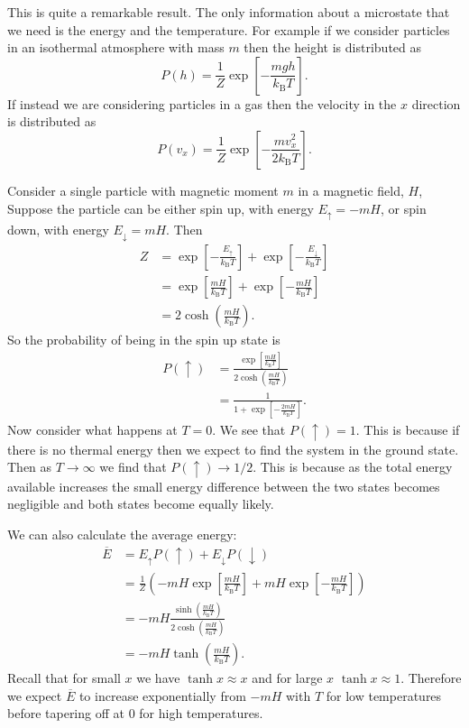\documentclass[a4paper]{article}
\newcommand{\boltzmann}{k_\mathrm{B}}
\newcommand{\mean}[1]{\overline{#1}}
\begin{document}
    This is quite a remarkable result.
    The only information about a microstate that we need is the energy and the temperature.
    For example if we consider particles in an isothermal atmosphere with mass \(m\) then the height is distributed as
    \[P(h) = \frac{1}{Z}\exp\left[-\frac{mgh}{\boltzmann T}\right].\]
    If instead we are considering particles in a gas then the velocity in the \(x\) direction is distributed as
    \[P(v_x) = \frac{1}{Z}\exp\left[-\frac{mv_x^2}{2\boltzmann T}\right].\]
    
    \begin{example}
        Consider a single particle with magnetic moment \(m\) in a magnetic field, \(H\), 
        Suppose the particle can be either spin up, with energy \(E_{\uparrow} = -mH\), or spin down, with energy \(E_{\downarrow} = mH\).
        Then
        \begin{align*}
            Z &= \exp\left[-\frac{E_{\uparrow}}{\boltzmann T}\right] + \exp\left[-\frac{E_{\downarrow}}{\boltzmann T}\right]\\
            &= \exp\left[\frac{mH}{\boltzmann T}\right] + \exp\left[-\frac{mH}{\boltzmann T}\right]\\
            &= 2\cosh\left(\frac{mH}{\boltzmann T}\right).
        \end{align*}
        So the probability of being in the spin up state is
        \begin{align*}
            P(\uparrow) &= \frac{\exp\left[\frac{mH}{\boltzmann T}\right]}{2\cosh\left(\frac{mH}{\boltzmann T}\right)}\\
            &= \frac{1}{1 + \exp\left[-\frac{2mH}{\boltzmann T}\right]}.
        \end{align*}
        Now consider what happens at \(T = 0\).
        We see that \(P(\uparrow) = 1\).
        This is because if there is no thermal energy then we expect to find the system in the ground state.
        Then as \(T \to \infty\) we find that \(P(\uparrow)\to1/2\).
        This is because as the total energy available increases the small energy difference between the two states becomes negligible and both states become equally likely.
        
        We can also calculate the average energy:
        \begin{align*}
            \mean{E} &= E_{\uparrow}P(\uparrow) + E_{\downarrow}P(\downarrow)\\
            &= \frac{1}{Z}\left(-mH\exp\left[\frac{mH}{\boltzmann T}\right] + mH\exp\left[-\frac{mH}{\boltzmann T}\right]\right)\\
            &= -mH\frac{\sinh\left(\frac{mH}{\boltzmann T}\right)}{2\cosh\left(\frac{mH}{\boltzmann T}\right)}\\
            &= -mH\tanh\left(\frac{mH}{\boltzmann T}\right).
        \end{align*}
        Recall that for small \(x\) we have \(\tanh x \approx x\) and for large \(x\) \(\tanh x\approx 1\).
        Therefore we expect \(\mean{E}\) to increase exponentially from \(-mH\) with \(T\) for low temperatures before tapering off at \(0\) for high temperatures.
        

\end{example}
\end{document}
